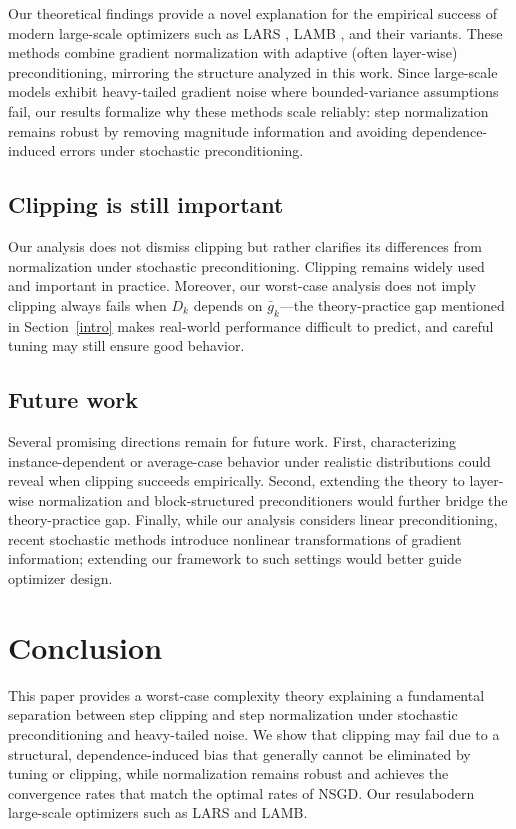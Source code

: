 \documentclass{article}
\newcommand{\barg}{\bar{g}}
\theoremstyle{plain}
\theoremstyle{definition}
\theoremstyle{remark}
\begin{document}
Our theoretical findings provide a novel explanation for the empirical success of modern large-scale optimizers such as LARS \citep{you2017large,you2018imagenet}, LAMB \citep{you2019large}, and their variants. These methods combine gradient normalization with adaptive (often layer-wise) preconditioning, mirroring the structure analyzed in this work. Since large-scale models exhibit heavy-tailed gradient noise where bounded-variance assumptions fail, our results formalize why these methods scale reliably: step normalization remains robust by removing magnitude information and avoiding dependence-induced errors under stochastic preconditioning.


\subsection{Clipping is still important}
Our analysis does not dismiss clipping but rather clarifies its differences from normalization under stochastic preconditioning. Clipping remains widely used and important in practice. Moreover, our worst-case analysis does not imply clipping always fails when $D_k$ depends on $\barg_k$—the theory-practice gap mentioned in Section~\ref{intro} makes real-world performance difficult to predict, and careful tuning may still ensure good behavior.


\subsection{Future work}
Several promising directions remain for future work. First, characterizing instance-dependent or average-case behavior under realistic distributions could reveal when clipping succeeds empirically. Second, extending the theory to layer-wise normalization and block-structured preconditioners would further bridge the theory-practice gap. Finally, while our analysis considers linear preconditioning, recent stochastic methods introduce nonlinear transformations of gradient information; extending our framework to such settings would better guide optimizer design.








\section{Conclusion}
This paper provides a worst-case complexity theory explaining a fundamental separation between step clipping and step normalization under stochastic preconditioning and heavy-tailed noise. We show that clipping may fail due to a structural, dependence-induced bias that generally cannot be eliminated by tuning or clipping, while normalization remains robust and achieves the convergence rates that match the optimal rates of NSGD. Our resulabodern large-scale optimizers such as LARS and LAMB.
\end{document}
